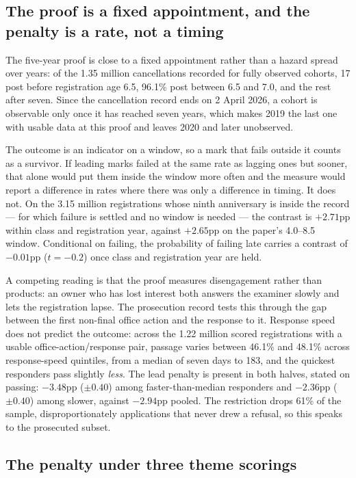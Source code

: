\subsection{The proof is a fixed appointment, and the penalty is a rate, not a timing}\label{sec:gate_timing}

The five-year proof is close to a fixed appointment rather than a hazard
spread over years: of the 1.35 million cancellations recorded for fully
observed cohorts, 17 post before registration age 6.5, 96.1\% post between
6.5 and 7.0, and the rest after seven. Since the cancellation record ends
on 2 April 2026, a cohort is observable only once it has reached seven
years, which makes 2019 the last one with usable data at this proof and
leaves 2020 and later unobserved.

The outcome is an indicator on a window, so a mark that fails outside it
counts as a survivor. If leading marks failed at the same rate as lagging
ones but sooner, that alone would put them inside the window more often
and the measure would report a difference in rates where there was only a
difference in timing. It does not. On the 3.15 million registrations whose
ninth anniversary is inside the record --- for which failure is settled
and no window is needed --- the contrast is $+2.71$pp within class and
registration year, against $+2.65$pp on the paper's 4.0--8.5 window.
Conditional on failing, the probability of failing late carries a contrast
of $-0.01$pp ($t = -0.2$) once class and registration year are held.

A competing reading is that the proof measures disengagement rather than
products: an owner who has lost interest both answers the examiner slowly
and lets the registration lapse. The prosecution record tests this through
the gap between the first non-final office action and the response to it.
Response speed does not predict the outcome: across the 1.22 million
scored registrations with a usable office-action/response pair, passage
varies between 46.1\% and 48.1\% across response-speed quintiles, from a
median of seven days to 183, and the quickest responders pass slightly
\emph{less}. The lead penalty is present in both halves, stated on
passing: $-3.48$pp ($\pm 0.40$) among faster-than-median responders and
$-2.36$pp ($\pm 0.40$) among slower, against $-2.94$pp pooled. The
restriction drops 61\% of the sample, disproportionately applications that
never drew a refusal, so this speaks to the prosecuted subset.

\subsection{The penalty under three theme scorings}\label{sec:three_scorings}

